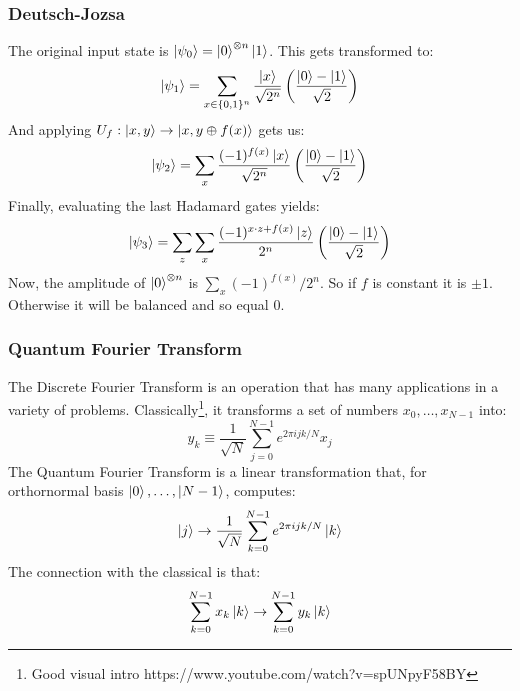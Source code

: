 \documentclass{beamer}
\begin{document}
        \begin{frame}
            \frametitle{Deutsch-Jozsa}
            The original input state is $\ket{\psi_0} = \ket{0}^{\otimes n}\ket{1}$.
            This gets transformed to:
            \begin{equation}
                \ket{\psi_1} = \sum_{x \in \{0,1\}^n}\frac{\ket{x}}{\sqrt{2^n}}\left(\frac{\ket{0} -\ket{1}}{\sqrt{2}} \right)
            \end{equation}
            And applying $U_f: \ket{x,y} \to \ket{x, y \oplus f(x)}$ gets us:
            \begin{equation}
                \ket{\psi_2} = \sum_x \frac{(-1)^{f(x)} \ket{x}}{\sqrt{2^n}}\left(\frac{\ket{0} -\ket{1}}{\sqrt{2}} \right)
            \end{equation}
            Finally, evaluating the last Hadamard gates yields:
            \begin{equation}
                \ket{\psi_3} = \sum_z \sum_x \frac{(-1)^{x\cdot z + f(x)}\ket{z}}{2^n}\left(\frac{\ket{0} -\ket{1}}{\sqrt{2}} \right)
            \end{equation}
            Now, the amplitude of $\ket{0}^{\otimes n}$ is $\sum_x (-1)^{f(x)}/2^n$. So if $f$ is constant
            it is $\pm 1$. Otherwise it will be balanced and so equal $0$. 
        \end{frame}
        \begin{frame}
            \frametitle{Quantum Fourier Transform}
            The Discrete Fourier Transform is an operation that has many applications in a variety of problems.
            Classically\footnote{Good visual intro https://www.youtube.com/watch?v=spUNpyF58BY}, it transforms a set of numbers $x_0, \dots, x_{N-1}$ into:
            \begin{equation}
                y_k \equiv \frac{1}{\sqrt{N}} \sum_{j=0}^{N - 1} e^{2\pi i j k / N} x_j
            \end{equation}
            The Quantum Fourier Transform is a linear transformation that,
            for orthornormal basis $\ket{0}, \dots, \ket{N -1}$, computes:
            \begin{equation}
                \ket{j} \to \frac{1}{\sqrt{N}} \sum_{k=0}^{N - 1} e^{2\pi i j k / N} \ket{k}
            \end{equation}
            The connection with the classical is that:
            \begin{equation}
                \sum_{k=0}^{N - 1} x_k \ket{k} \to  \sum_{k=0}^{N - 1} y_k \ket{k}
            \end{equation}
        \end{frame}
\end{document}

